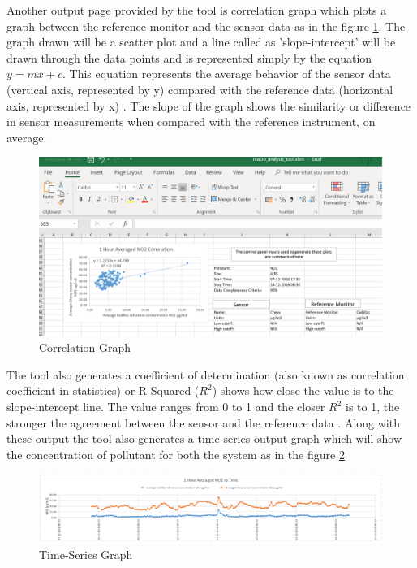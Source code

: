  
\par
Another output page provided by the tool is correlation graph which plots a graph between the reference monitor and the sensor data as in the figure \ref{cor}.
The graph drawn will be a scatter plot and a line called as 'slope-intercept' will be drawn through the data points and is represented simply by the equation $ y = mx + c $. This equation represents the average behavior of the sensor data (vertical axis, represented by y) compared with the reference data (horizontal axis, represented by x) \cite{National2017}. The slope of the graph shows the similarity or difference in sensor measurements when compared with the reference instrument, on average. 

\begin{figure}[h]
    \begin{center}
    \includegraphics[scale=0.35]{./images/figure7.png}
    \end{center}
    \caption{Correlation Graph}
    \label{cor}
  \end{figure}

The tool also generates a coefficient of determination (also known as correlation coefficient in statistics) or R-Squared ($R^2 $) shows how close the value is to the slope-intercept line. The value ranges from 0 to 1 and the closer $R^2$ is to 1, the stronger the agreement between the sensor and the reference data \cite{Williams2018}. Along with these output the tool also generates a time series output graph which will show the concentration of pollutant for both the system as in the figure \ref{time}

\begin{figure}[h]
    \begin{center}
    \includegraphics[scale=0.40]{./images/figure8.png}
    \end{center}
    \caption{Time-Series Graph}
    \label{time}
  \end{figure}

